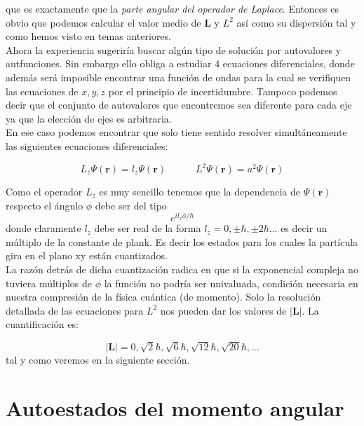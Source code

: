 \documentclass[12pt,a4paper]{article}
\numberwithin{equation}{section}
\numberwithin{figure}{section}
\newcommand{\tquad}{\quad \quad \quad}
\newcommand{\rn}{\mathbf{r}}
\newcommand{\Ln}{\mathbf{L}}
\begin{document}
que es exactamente que la \textit{parte angular del operador de Laplace}. Entonces es obvio que podemos calcular el valor medio de $\Ln$ y $L^2$ así como su dispersión tal y como hemos visto en temas anteriores. \\

Ahora la experiencia sugeriría buscar algún tipo de solución por autovalores y autfunciones. Sin embargo ello obliga a estudiar 4 ecuaciones diferenciales, donde además será imposible encontrar una función de ondas para la cual se verifiquen las ecuaciones de $x,y,z$ por el principio de incertidumbre. Tampoco podemos decir que el conjunto de autovalores que encontremos sea diferente para cada eje ya que la elección de ejes es arbitraria. \\

En ese caso podemos encontrar que solo tiene sentido resolver simultáneamente las siguientes ecuaciones diferenciales:

\begin{equation}
L_z \Psi (\rn) = l_z \Psi (\rn) \tquad L^2 \Psi (\rn) = a^2 \Psi (\rn) \label{Ec:autoestadosmomentoangular}
\end{equation}

Como el operador $L_z$ es muy sencillo tenemos que la dependencia de $\Psi(\rn)$ respecto el ángulo $\phi$ debe ser del tipo $$ e^{i l_z \phi/\hbar}$$ donde claramente $l_z$ debe ser real de la forma $l_z =0, \pm \hbar, \pm 2 \hbar...$ es decir un múltiplo de la constante de plank. Es decir los estados para los cuales la partícula gira en el plano xy están cuantizados. \\

La razón detrás de dicha cuantización radica en que si la exponencial compleja no tuviera múltiplos de $\phi$ la función no podría ser univaluada, condición necesaria en nuestra compresión de la física cuántica (de momento). Solo la resolución detallada de las ecuaciones para $L^2$ nos pueden dar los valores de $|\Ln|$. La cuantificación es:

\begin{equation}
| \Ln | = 0, \sqrt{2} \hbar, \sqrt{6} \hbar, \sqrt{12} \hbar, \sqrt{20} \hbar, \ldots
\end{equation}
tal y como veremos en la siguiente sección.

\section{Autoestados del momento angular}
\end{document}
